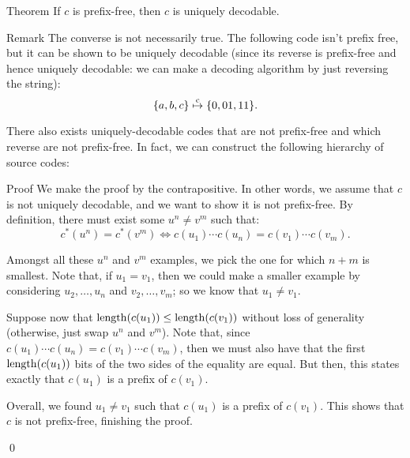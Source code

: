 \documentclass[a4paper]{article}
\begin{document}
\begin{parag}{Theorem}
    If $c$ is prefix-free, then $c$ is uniquely decodable.

    \begin{subparag}{Remark}
        The converse is not necessarily true. The following code isn't prefix free, but it can be shown to be uniquely decodable (since its reverse is prefix-free and hence uniquely decodable: we can make a decoding algorithm by just reversing the string):
        \[\left\{a, b, c\right\} \over{\mapsto}{c} \left\{0, 01, 11\right\}.\]

        There also exists uniquely-decodable codes that are not prefix-free and which reverse are not prefix-free. In fact, we can construct the following hierarchy of source codes:
    \end{subparag}

    \begin{subparag}{Proof}
        We make the proof by the contrapositive. In other words, we assume that $c$ is not uniquely decodable, and we want to show it is not prefix-free. By definition, there must exist some $u^n \neq v^m$ such that: 
        \[c^*\left(u^n\right) = c^*\left(v^m\right) \iff c\left(u_1\right) \cdots c\left(u_n\right) = c\left(v_1\right) \cdots c\left(v_m\right).\]
        
        Amongst all these $u^n$ and $v^m$ examples, we pick the one for which $n + m$ is smallest. Note that, if $u_1 = v_1$, then we could make a smaller example by considering $u_2, \ldots, u_n$ and $v_2, \ldots, v_m$; so we know that $u_1 \neq v_1$. 

        Suppose now that $\length\left(c\left(u_1\right)\right) \leq \length\left(c\left(v_1\right)\right)$ without loss of generality (otherwise, just swap $u^n$ and $v^m$). Note that, since $c\left(u_1\right) \cdots c\left(u_n\right) = c\left(v_1\right) \cdots c\left(v_m\right)$, then we must also have that the first $\length\left(c\left(u_1\right)\right)$ bits of the two sides of the equality are equal. But then, this states exactly that $c\left(u_1\right)$ is a prefix of $c\left(v_1\right)$. 

        Overall, we found $u_1 \neq v_1$ such that $c\left(u_{1}\right)$ is a prefix of $c\left(v_1\right)$. This shows that $c$ is not prefix-free, finishing the proof.

        \qed
    \end{subparag}
\end{parag}
\end{document}
